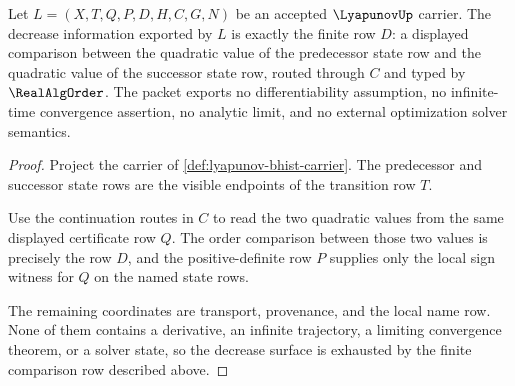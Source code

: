 \begin{theorem}
\label{thm:lyapunov-decrease-ledger}
Let $L=(X,T,Q,P,D,H,C,G,N)$ be an accepted $\LyapunovUp$ carrier. The decrease
information exported by $L$ is exactly the finite row $D$: a displayed
comparison between the quadratic value of the predecessor state row and the
quadratic value of the successor state row, routed through $C$ and typed by
$\RealAlgOrder$. The packet exports no differentiability assumption, no
infinite-time convergence assertion, no analytic limit, and no external
optimization solver semantics.
\end{theorem}
\begin{proof}
Project the carrier of \autoref{def:lyapunov-bhist-carrier}. The predecessor
and successor state rows are the visible endpoints of the transition row $T$.

Use the continuation routes in $C$ to read the two quadratic values from the
same displayed certificate row $Q$. The order comparison between those two
values is precisely the row $D$, and the positive-definite row $P$ supplies only
the local sign witness for $Q$ on the named state rows.

The remaining coordinates are transport, provenance, and the local name row.
None of them contains a derivative, an infinite trajectory, a limiting
convergence theorem, or a solver state, so the decrease surface is exhausted by
the finite comparison row described above.
\end{proof}

